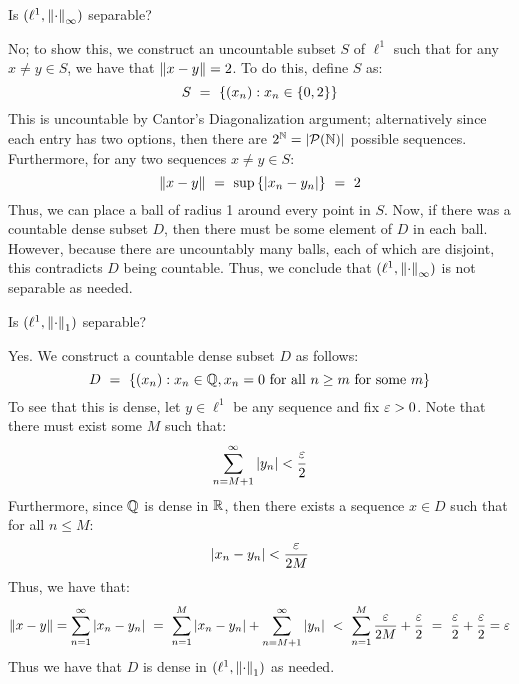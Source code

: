 \newpage
\label{q18}
\begin{qu}[num=18.1]
    Is $ (\ell^{1},\left\|\cdot\right\|_{\infty}) $ separable?
\end{qu}

\begin{soln}
    No; to show this, we construct an uncountable subset $ S $ of $ \ell^{1} $
    such that for any $ x \neq y \in S $, we have that $ \left\|x-y\right\| = 2 $. To do
    this, define $ S $ as:
    \begin{equation*}
        S \ = \ \left\{{(x_{n}):x_{n} \in \left\{{0, 2}\right\}}\right\}
    \end{equation*}
    This is uncountable by Cantor's Diagonalization argument; alternatively since
    each entry has two options, then there are $ 2^{\mathbb{N}} = \abs{\mathcal{P}(\mathbb{N})} $
    possible sequences. Furthermore, for any two sequences $ x \neq y \in S $:
    \begin{equation*}
        \norm{x-y} \ = \ \sup\set{\abs{x_{n}-y_{n}}} \ = \ 2
    \end{equation*}
    Thus, we can place a ball of radius 1 around every point in $ S $. Now, if
    there was a countable dense subset $ D $, then there must be some element of
    $ D $ in each ball. However, because there are uncountably many balls, each
    of which are disjoint, this contradicts $ D $ being countable. Thus, we
    conclude that $ (\ell^{1},\left\|\cdot\right\|_{\infty}) $ is not separable as
    needed.
\end{soln}

\begin{qu}[num=18.2]
    Is $ (\ell^{1},\left\|\cdot\right\|_{1}) $ separable?
\end{qu}

\begin{soln}
    Yes. We construct a countable dense subset $ D $ as follows:
    \begin{equation*}
        D \ = \ \set{(x_{n}):x_{n}\in\bQ, x_{n} = 0 \trm{ for all } n \geq m
        \trm{ for some } m}
    \end{equation*}
    To see that this is dense, let $ y \in \ell^{1} $ be any sequence and fix
    $ \operatorname{\varepsilon} > 0 $. Note that there must exist some $ M $ such that:
    \begin{equation*}
        \sum_{n=M+1}^{\infty}\abs{y_{n}} < \frac{\operatorname{\varepsilon}}{2}
    \end{equation*}
    Furthermore, since $ \mathbb{Q} $ is dense in $ \mathbb{R} $, then there exists a sequence
    $ x \in D $ such that for all $ n \leq M $:
    \begin{equation*}
        \abs{x_{n}-y_{n}} < \frac{\operatorname{\varepsilon}}{2M}
    \end{equation*}
    Thus, we have that:
    \begin{equation*}
        \norm{x-y} = \sum_{n=1}^{\infty}\abs{x_{n}-y_{n}} \ = \
        \sum_{n=1}^{M}\abs{x_{n}-y_{n}} + \sum_{n=M+1}^{\infty}\abs{y_{n}} \ < \
        \sum_{n=1}^{M}\frac{\ep}{2M} + \frac{\ep}{2} \ = \ \frac{\ep}{2}+
        \frac{\ep}{2} = \ep
    \end{equation*}
    Thus we have that $ D $ is dense in $ (\ell^{1},\left\|\cdot\right\|_{1}) $ as
    needed.
\end{soln}


